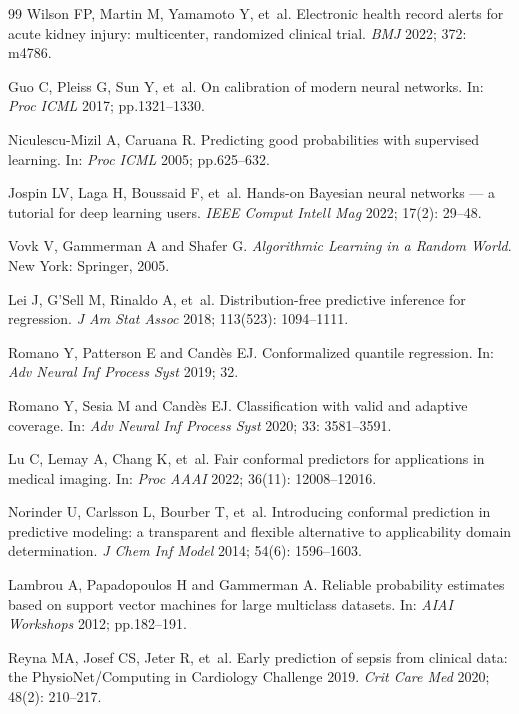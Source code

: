 \documentclass[12pt]{article}
\begin{document}
\begin{thebibliography}{99}
Wilson FP, Martin M, Yamamoto Y, et~al.
Electronic health record alerts for acute kidney injury:
multicenter, randomized clinical trial.
\textit{BMJ} 2022; 372: m4786.

Guo C, Pleiss G, Sun Y, et~al.
On calibration of modern neural networks.
In: \textit{Proc ICML} 2017; pp.1321--1330.

Niculescu-Mizil A, Caruana R.
Predicting good probabilities with supervised learning.
In: \textit{Proc ICML} 2005; pp.625--632.

Jospin LV, Laga H, Boussaid F, et~al.
Hands-on Bayesian neural networks --- a tutorial for deep
learning users.
\textit{IEEE Comput Intell Mag} 2022; 17(2): 29--48.

Vovk V, Gammerman A and Shafer G.
\textit{Algorithmic Learning in a Random World}.
New York: Springer, 2005.

Lei J, G'Sell M, Rinaldo A, et~al.
Distribution-free predictive inference for regression.
\textit{J Am Stat Assoc} 2018; 113(523): 1094--1111.

Romano Y, Patterson E and Cand\`{e}s EJ.
Conformalized quantile regression.
In: \textit{Adv Neural Inf Process Syst} 2019; 32.

Romano Y, Sesia M and Cand\`{e}s EJ.
Classification with valid and adaptive coverage.
In: \textit{Adv Neural Inf Process Syst} 2020; 33: 3581--3591.

Lu C, Lemay A, Chang K, et~al.
Fair conformal predictors for applications in medical imaging.
In: \textit{Proc AAAI} 2022; 36(11): 12008--12016.

Norinder U, Carlsson L, Bourber T, et~al.
Introducing conformal prediction in predictive modeling:
a transparent and flexible alternative to applicability domain
determination.
\textit{J Chem Inf Model} 2014; 54(6): 1596--1603.

Lambrou A, Papadopoulos H and Gammerman A.
Reliable probability estimates based on support vector machines
for large multiclass datasets.
In: \textit{AIAI Workshops} 2012; pp.182--191.

Reyna MA, Josef CS, Jeter R, et~al.
Early prediction of sepsis from clinical data: the
PhysioNet/Computing in Cardiology Challenge 2019.
\textit{Crit Care Med} 2020; 48(2): 210--217.


\end{thebibliography}
\end{document}
